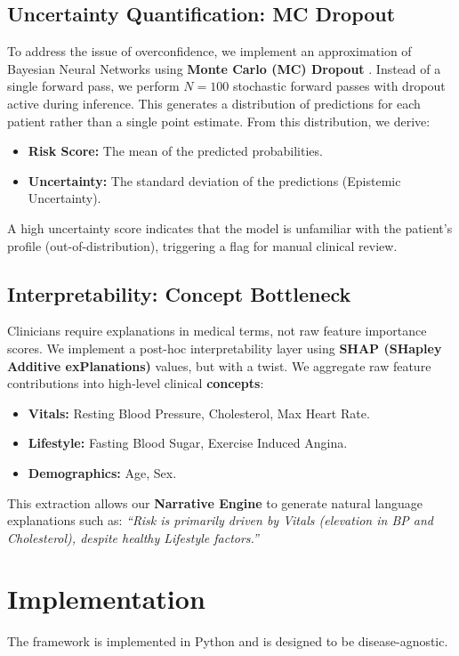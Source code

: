 \documentclass[conference]{IEEEtran}
\begin{document}
\subsection{Uncertainty Quantification: MC Dropout}
To address the issue of overconfidence, we implement an approximation of Bayesian Neural Networks using \textbf{Monte Carlo (MC) Dropout} \cite{gal2016dropout}. Instead of a single forward pass, we perform $N=100$ stochastic forward passes with dropout active during inference. This generates a distribution of predictions for each patient rather than a single point estimate.
From this distribution, we derive:
\begin{itemize}
    \item \textbf{Risk Score:} The mean of the predicted probabilities.
    \item \textbf{Uncertainty:} The standard deviation of the predictions (Epistemic Uncertainty).
\end{itemize}
A high uncertainty score indicates that the model is unfamiliar with the patient's profile (out-of-distribution), triggering a flag for manual clinical review.

\subsection{Interpretability: Concept Bottleneck}
Clinicians require explanations in medical terms, not raw feature importance scores. We implement a post-hoc interpretability layer using \textbf{SHAP (SHapley Additive exPlanations)} values, but with a twist. We aggregate raw feature contributions into high-level clinical \textbf{concepts}:
\begin{itemize}
    \item \textbf{Vitals:} Resting Blood Pressure, Cholesterol, Max Heart Rate.
    \item \textbf{Lifestyle:} Fasting Blood Sugar, Exercise Induced Angina.
    \item \textbf{Demographics:} Age, Sex.
\end{itemize}
This extraction allows our \textbf{Narrative Engine} to generate natural language explanations such as: \textit{``Risk is primarily driven by Vitals (elevation in BP and Cholesterol), despite healthy Lifestyle factors.''}

\section{Implementation}
The framework is implemented in Python and is designed to be disease-agnostic.
\end{document}
